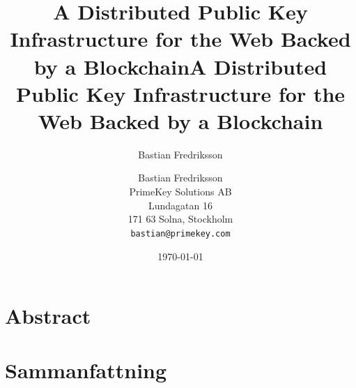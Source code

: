 \documentclass{style/kththesis}
\title{A Distributed Public Key Infrastructure for the Web Backed by a Blockchain}
\author{Bastian Fredriksson}
\date{\today}
\begin{document}

\renewcommand\qedsymbol{$\blacksquare$}
\setlength{\headheight}{50pt}
\renewenvironment{abstract}
 {\small
  \begin{center}
  \bfseries \abstractname\vspace{0em}\vspace{0pt}
  \end{center}
  \list{}{%
    \setlength{\leftmargin}{1.5in}
    \setlength{\rightmargin}{\leftmargin}%
  }%
  \item\relax}
 {\endlist}
\ifbook

\frontmatter
\titlepage
\section*{Abstract}

\section*{Sammanfattning}



\cleardoublepage
\else
\title{A Distributed Public Key Infrastructure for the Web Backed by a Blockchain}
\author{
  Bastian Fredriksson\\
  PrimeKey Solutions AB\\
  Lundagatan 16\\
  171 63 Solna, Stockholm\\
  \texttt{bastian@primekey.com}
}
\twocolumn[
  \begin{@twocolumnfalse}
    \maketitle
    \begin{abstract}
      
    \end{abstract}
  \end{@twocolumnfalse}
  ]
\fi

\ifbook
\tableofcontents
\mainmatter

\else
\twocolumntoc
\fi
\end{document}
